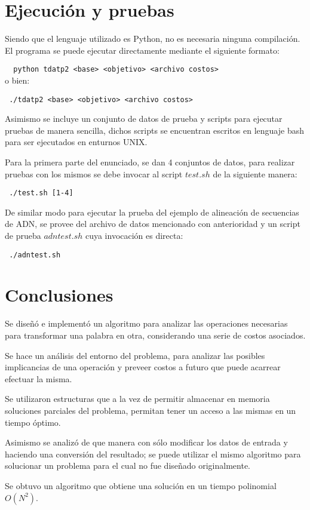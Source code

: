 \documentclass[12pt]{article}
\begin{document}
\newpage
\section{Ejecución y pruebas}
	Siendo que el lenguaje utilizado es Python, no es necesaria ninguna 
	compilación. El programa se puede ejecutar directamente mediante el 
	siguiente formato:
	
	\verb#  python tdatp2 <base> <objetivo> <archivo costos>#
	\\o bien: 
	
	\verb# ./tdatp2 <base> <objetivo> <archivo costos>#
	
	Asimismo se incluye un conjunto de datos de prueba y scripts para 
	ejecutar pruebas de manera sencilla, dichos scripts se encuentran 
	escritos en lenguaje bash para ser ejecutados en enturnos UNIX.
	
	Para la primera parte del enunciado, se dan 4 conjuntos de datos, 
	para realizar pruebas con los mismos se debe invocar al script $test.sh$ 
	de la siguiente manera:
	
	\verb# ./test.sh [1-4]#
	
	De similar modo para ejecutar la prueba del ejemplo de alineación de
	secuencias de ADN, se provee del archivo de datos mencionado con 
	anterioridad y un script de prueba $adntest.sh$ cuya invocación es directa:
	
	\verb# ./adntest.sh#
	
\newpage
\section{Conclusiones}
	Se diseñó e implementó un algoritmo para analizar las operaciones 
	necesarias para transformar una palabra en otra, considerando una
	serie de costos asociados.
	
	Se hace un análisis del entorno del problema, para analizar las 
	posibles implicancias de una operación y preveer costos a futuro
	que puede acarrear efectuar la misma.
	
	Se utilizaron estructuras que a la vez de permitir almacenar en 
	memoria soluciones parciales del problema, permitan tener un acceso
	a las mismas en un tiempo óptimo.
	
	Asimismo se analizó de que manera con sólo modificar los datos de 
	entrada y haciendo una conversión del resultado; se puede utilizar 
	el mismo algoritmo para solucionar un problema para el cual no fue
	diseñado originalmente.
	
	Se obtuvo un algoritmo que obtiene una solución en un tiempo polinomial $O(N^{2})$.
\end{document}
